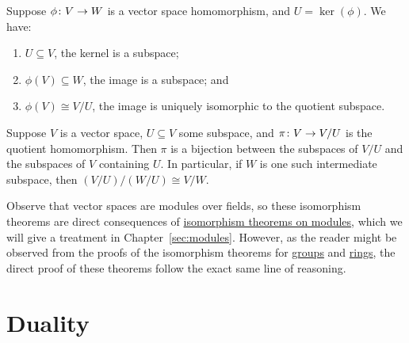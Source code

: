 \begin{theorem}\label{thm:iso-1-vsp}
    Suppose \(\phi\colon V\to W\) is a vector space homomorphism,
    and \(U = \ker(\phi)\).
    We have:
    \begin{enumerate}[label={(\alph*)}, itemsep=0mm]
        \item \(U \subseteq V\), the kernel is a subspace;
        \item \(\phi(V) \subseteq W\), the image is a subspace; and
        \item \(\phi(V) \cong V/U\), the image is uniquely isomorphic to the quotient subspace.
    \end{enumerate}
\end{theorem}
\begin{theorem}\label{thm:iso-3-vsp}\label{thm:iso-4-vsp}
    Suppose \(V\) is a vector space, \(U \subseteq V\) some subspace,
    and \(\pi\colon V\to V/U\) is the quotient homomorphism.
    Then \(\pi\) is a bijection between the subspaces of \(V/U\)
    and the subspaces of \(V\) containing \(U\).
    In particular, if \(W\) is one such intermediate subspace,
    then \((V/U)/(W/U) \cong V/W\).
\end{theorem}
\begin{remark}
    Observe that vector spaces are modules over fields,
    so these isomorphism theorems are direct consequences of
    \hyperref[thm:iso-1-module]{isomorphism theorems on modules},
    which we will give a treatment in Chapter~\ref{sec:modules}.
    However, as the reader might be observed
    from the proofs of the isomorphism theorems
    for \hyperref[thm:iso-1-group]{groups} and \hyperref[thm:iso-1-ring]{rings},
    the direct proof of these theorems follow the exact same line of reasoning.
\end{remark}


\section{Duality}

